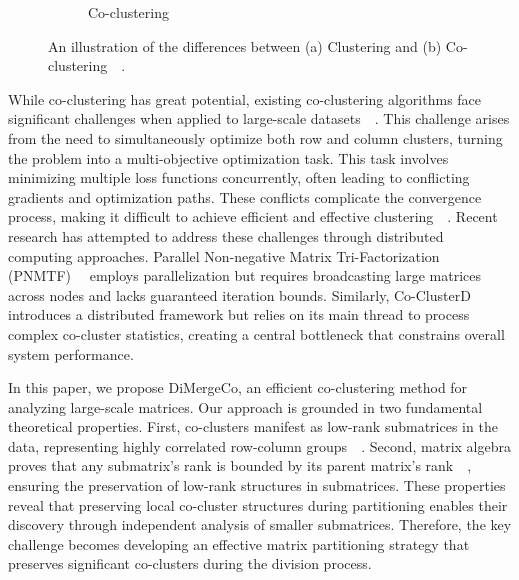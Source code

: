\documentclass[journal]{IEEEtran}
\renewcommand{\cite}[1]{~\autocite{#1}}
\begin{document}
\begin{figure}[t]
\begin{subfigure}[b]{0.22\textwidth}
        \caption{Co-clustering}
        \label{fig:cocluster}
    \end{subfigure}
    \caption{An illustration of the differences between (a) Clustering and (b) Co-clustering~\cite{yan2017CoclusteringMultidimensionalBig}.}
    \label{fig:cocomparison}
\end{figure}

While co-clustering has great potential, existing co-clustering algorithms face significant challenges when applied to large-scale datasets~\cite{cheng2015CoClusterDDistributedFramework}. This challenge arises from the need to simultaneously optimize both row and column clusters, turning the problem into a multi-objective optimization task. This task involves minimizing multiple loss functions concurrently, often leading to conflicting gradients and optimization paths. These conflicts complicate the convergence process, making it difficult to achieve efficient and effective clustering~\cite{coello2007EvolutionaryAlgorithmsSolving}. Recent research has attempted to address these challenges through distributed computing approaches. Parallel Non-negative Matrix Tri-Factorization (PNMTF)~\cite{chen2023ParallelNonNegativeMatrix} employs parallelization but requires broadcasting large matrices across nodes and lacks guaranteed iteration bounds. Similarly, Co-ClusterD~\cite{cheng2015CoClusterDDistributedFramework} introduces a distributed framework but relies on its main thread to process complex co-cluster statistics, creating a central bottleneck that constrains overall system performance.

In this paper, we propose DiMergeCo, an efficient co-clustering method for analyzing large-scale matrices. Our approach is grounded in two fundamental theoretical properties. First, co-clusters manifest as low-rank submatrices in the data, representing highly correlated row-column groups~\cite{}. Second, matrix algebra proves that any submatrix's rank is bounded by its parent matrix's rank~\cite{horn1985MatrixAnalysis}, ensuring the preservation of low-rank structures in submatrices. These properties reveal that preserving local co-cluster structures during partitioning enables their discovery through independent analysis of smaller submatrices. Therefore, the key challenge becomes developing an effective matrix partitioning strategy that preserves significant co-clusters during the division process.
\end{document}
